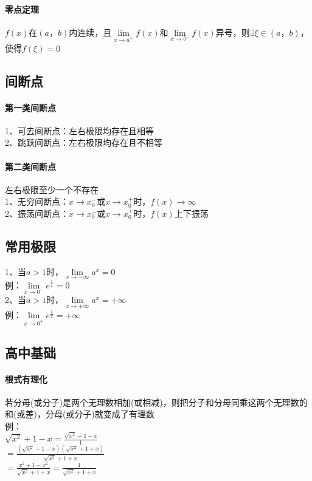 \documentclass{article}
\begin{document}
\begin{flushleft}
\paragraph{零点定理}
$f(x)$在$(a，b)$内连续，且$\lim\limits_{x\to a^+} f(x)$和$\lim\limits_{x\to b^-} f(x)$异号，则$\exists \xi \in (a，b)$，使得$f(\xi)=0$\\

\subsection{间断点}

\paragraph{第一类间断点}
1、可去间断点：左右极限均存在且相等\\
2、跳跃间断点：左右极限均存在且不相等\\
\paragraph{第二类间断点}
左右极限至少一个不存在\\
1、无穷间断点：$x\to x_0^-$或$x\to x_0^+$时，$f(x)\to \infty$\\
2、振荡间断点：$x\to x_0^-$或$x\to x_0^+$时，$f(x)$上下振荡\\

\subsection{常用极限}

1、当$a>1$时，$\lim\limits_{x\to-\infty}a^x=0$\\
\qquad 例：$\lim\limits_{x\to 0^-}e^{\frac{1}{x}}=0$\\
2、当$a>1$时，$\lim\limits_{x\to+\infty}a^x=+\infty$\\
\qquad 例：$\lim\limits_{x\to 0^+}e^{\frac{1}{x}}=+\infty$

\subsection{高中基础}

\paragraph{根式有理化}
若分母(或分子)是两个无理数相加(或相减)，则把分子和分母同乘这两个无理数的和(或差)，分母(或分子)就变成了有理数\\
例：\\
\qquad $\sqrt{x^2}+1-x=\frac{\sqrt{x^2}+1-x}{1}$\\
\qquad $=\frac{(\sqrt{x^2}+1-x)(\sqrt{x^2}+1+x)}{\sqrt{x^2}+1+x}$\\
\qquad $=\frac{x^2+1-x^2}{\sqrt{x^2}+1+x}=\frac{1}{\sqrt{x^2}+1+x}$\\


\end{flushleft}
\end{document}
